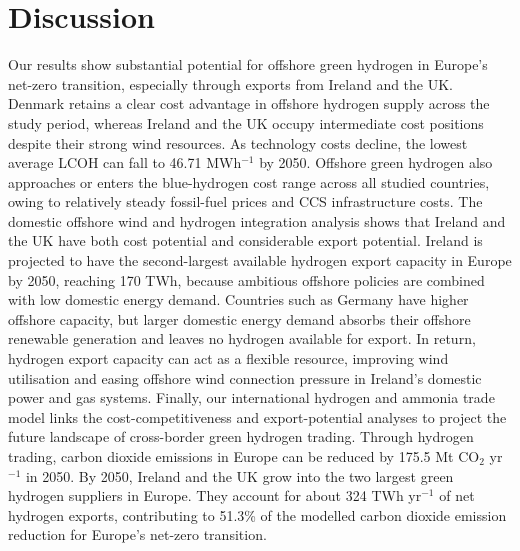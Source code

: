 \documentclass[pdflatex,sn-mathphys,Numbered]{sn-jnl}%
\begin{document}
\section{Discussion}
Our results show substantial potential for offshore green hydrogen in Europe's net-zero transition, especially through exports from Ireland and the UK.
Denmark retains a clear cost advantage in offshore hydrogen supply across the study period, whereas Ireland and the UK occupy intermediate cost positions despite their strong wind resources.
As technology costs decline, the lowest average LCOH can fall to 46.71 \texteuro{} MWh$^{-1}$ by 2050. Offshore green hydrogen also approaches or enters the blue-hydrogen cost range across all studied countries, owing to relatively steady fossil-fuel prices and CCS infrastructure costs.
The domestic offshore wind and hydrogen integration analysis shows that Ireland and the UK have both cost potential and considerable export potential. Ireland is projected to have the second-largest available hydrogen export capacity in Europe by 2050, reaching 170 TWh, because ambitious offshore policies are combined with low domestic energy demand. Countries such as Germany have higher offshore capacity, but larger domestic energy demand absorbs their offshore renewable generation and leaves no hydrogen available for export. In return, hydrogen export capacity can act as a flexible resource, improving wind utilisation and easing offshore wind connection pressure in Ireland's domestic power and gas systems.
Finally, our international hydrogen and ammonia trade model links the cost-competitiveness and export-potential analyses to project the future landscape of cross-border green hydrogen trading. Through hydrogen trading, carbon dioxide emissions in Europe can be reduced by 175.5 Mt CO$_2$ yr$^{-1}$ in 2050.
By 2050, Ireland and the UK grow into the two largest green hydrogen suppliers in Europe. They account for about 324 TWh yr$^{-1}$ of net hydrogen exports, contributing to 51.3\% of the modelled carbon dioxide emission reduction for Europe's net-zero transition.
\end{document}
